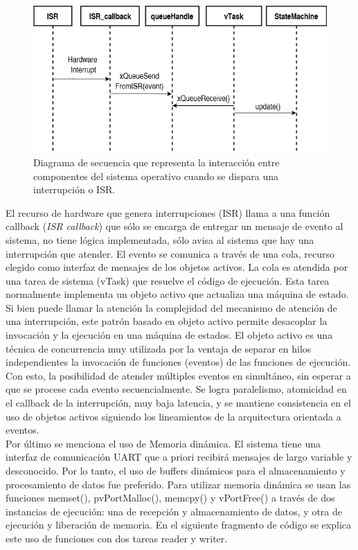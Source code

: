 \begin{figure}[ht]
	\centering
	\includegraphics[width=1\textwidth]{./Figures/ISRcallback.png}
	\caption{Diagrama de secuencia que representa la interacción entre componentes del sistema operativo cuando se dispara una interrupción o ISR.}
	\label{fig:ISR}
\end{figure}

El recurso de hardware que genera interrupciones (ISR) llama a una función callback (\textit{ISR callback}) que sólo se encarga de entregar un mensaje de evento al sistema, no tiene lógica implementada, sólo avisa al sistema que hay una interrupción que atender. El evento se comunica a través de una cola, recurso elegido como interfaz de mensajes de los objetos activos. La cola es atendida por una tarea de sistema (vTask) que resuelve el código de ejecución. Esta tarea normalmente implementa un objeto activo que actualiza una máquina de estado.\\

Si bien puede llamar la atención la complejidad del mecanismo de atención de una interrupción, este patrón basado en objeto activo permite desacoplar la invocación y la ejecución en una máquina de estados. El objeto activo es una técnica de concurrencia muy utilizada por la ventaja de separar en hilos independientes la invocación de funciones (eventos) de las funciones de ejecución. Con esto, la posibilidad de atender múltiples eventos en simultáneo, sin esperar a que se procese cada evento secuencialmente. Se logra paralelismo, atomicidad en el callback de la interrupción, muy baja latencia, y se mantiene consistencia en el uso de objetos activos siguiendo los lineamientos de la arquitectura orientada a eventos.\\


Por último se menciona el uso de Memoria dinámica. El sistema tiene una interfaz de comunicación UART que a priori recibirá mensajes de largo variable y desconocido. Por lo tanto, el uso de buffers dinámicos para el almacenamiento y procesamiento de datos fue preferido. Para utilizar memoria dinámica se usan las funciones memset(), pvPortMalloc(), memcpy() y vPortFree() a través de dos instancias de ejecución: una de recepción y almacenamiento de datos, y otra de ejecución y liberación de memoria. En el siguiente fragmento de código se explica este uso de funciones con dos tareas reader y writer.


